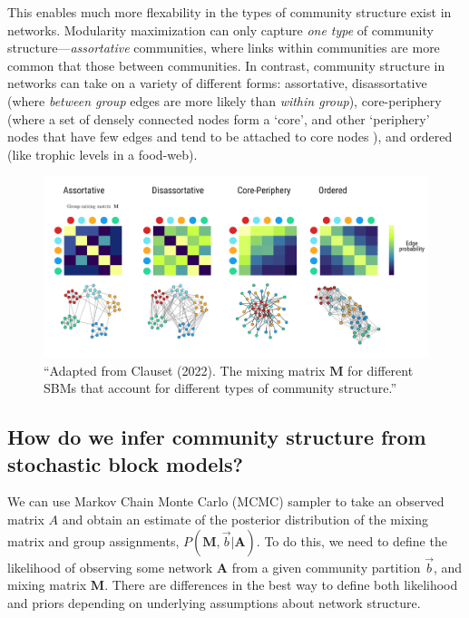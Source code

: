 \documentclass[
]{article}
\begin{document}
This enables much more flexability in the types of community structure
exist in networks. Modularity maximization can only capture \emph{one
type} of community structure---\emph{assortative} communities, where
links within communities are more common that those between communities.
In contrast, community structure in networks can take on a variety of
different forms: assortative, disassortative (where \emph{between group}
edges are more likely than \emph{within group}), core-periphery (where a
set of densely connected nodes form a `core', and other `periphery'
nodes that have few edges and tend to be attached to core nodes ), and
ordered (like trophic levels in a food-web).

\begin{figure}

{\centering \includegraphics{figures/blockmatrix.png}

}

\caption{\label{fig-blocks}``Adapted from Clauset (2022). The mixing
matrix \(\mathbf{M}\) for different SBMs that account for different
types of community structure.''}

\end{figure}

\hypertarget{how-do-we-infer-community-structure-from-stochastic-block-models}{%
\subsection{How do we infer community structure from stochastic block
models?}\label{how-do-we-infer-community-structure-from-stochastic-block-models}}

We can use Markov Chain Monte Carlo (MCMC) sampler to take an observed
matrix \(A\) and obtain an estimate of the posterior distribution of the
mixing matrix and group assignments,
\(P(\mathbf{M}, \vec{b} | \mathbf{A})\). To do this, we need to define
the likelihood of observing some network \(\mathbf{A}\) from a given
community partition \(\vec{b}\), and mixing matrix \(\mathbf{M}\). There
are differences in the best way to define both likelihood and priors
depending on underlying assumptions about network structure.
\end{document}
